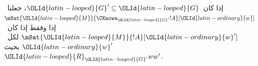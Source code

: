 \documentclass[../../../include/open-logic-section]{subfiles}
\begin{document}
\begin{defn}
إذا كان~$\OLId{latin-looped}{G}' \subseteq \OLId{latin-looped}{G}$، جعلنا~$\mSat{\OLId{latin-looped}{M}}{\CKnows_{\OLId{latin-looped}{G}'} !A}[\OLId{latin-ordinary}{w}]$ إذا
وفقط إذا كان~$\mSat{\OLId{latin-looped}{M}}{!A}[\OLId{latin-ordinary}{w}']$ لكل~$\OLId{latin-ordinary}{w}'$ بحيث~$\OLId{latin-looped}{R}_{\OLId{latin-looped}{G}'}ww'$.
\end{defn}
\end{document}
